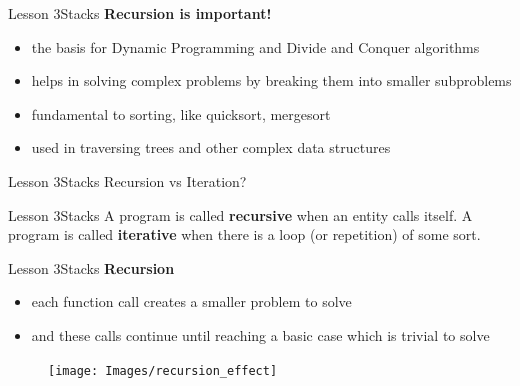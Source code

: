 \documentclass[aspectratio=1610]{beamer}
\begin{document}
\begin{frame}{Lesson 3}{Stacks}
\LARGE
\textbf{Recursion is important!}\\
\begin{itemize}
    \item the basis for Dynamic Programming and Divide and Conquer algorithms
    \item helps in solving complex problems by breaking them into smaller subproblems
    \item fundamental to sorting, like quicksort, mergesort
    \item used in traversing trees and other complex data structures
\end{itemize}
\end{frame}



\begin{frame}{Lesson 3}{Stacks}
\Huge
Recursion vs Iteration?
\end{frame}


\begin{frame}{Lesson 3}{Stacks}
\huge
A program is called \textbf{recursive} when an entity calls itself.
A program is called \textbf{iterative} when there is a loop (or
repetition) of some sort.
\end{frame}



\begin{frame}{Lesson 3}{Stacks}
\LARGE
\textbf{Recursion}\\
\begin{minipage}{0.53\textwidth}
\begin{itemize}
    \item each function call creates a smaller problem to solve
    \item and these calls continue until reaching a basic case which is trivial to solve
\end{itemize}
  \end{minipage}
\begin{minipage}{.0\textwidth}
      \begin{figure}
        \texttt{[image: Images/recursion\_effect]}
      \end{figure}
  \end{minipage}  
\end{frame}
\end{document}
